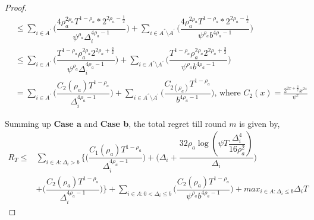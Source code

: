 \begin{proof}
\begin{align*}
&\leq\sum_{i\in A^{'}}\bigg(\dfrac{4\rho_{a}^{2\rho_{a}}T^{1-\rho_{a}}*2^{2\rho_{a}-\frac{1}{2}}}{\psi^{\rho_{a}}\Delta_{i}^{4\rho_{a}-1}} \bigg)+\sum_{i\in A^{''}\setminus A^{'}}\bigg(\dfrac{4\rho_{a}^{2\rho_{a}}T^{1-\rho_{a}}*2^{2\rho_{a}-\frac{1}{2}}}{\psi^{\rho_{a}}b^{4\rho_{a}-1}} \bigg)\\
&\leq\sum_{i\in A^{'}}\bigg(\dfrac{T^{1-\rho_{a}}\rho_{a}^{2\rho_{a}}2^{2\rho_{a}+\frac{3}{2}}}{\psi^{\rho_{a}}\Delta_{i}^{4\rho_{a}-1}} \bigg)+\sum_{i\in A^{''}\setminus A^{'}}\bigg(\dfrac{T^{1-\rho_{a}}\rho_{a}^{2\rho_{a}}2^{2\rho_{a}+\frac{3}{2}}}{\psi^{\rho_{a}}b^{4\rho_{a}-1}} \bigg)\\
& = \sum_{i\in A^{'}}\bigg(\dfrac{ C_{2}(\rho_{a}) T^{1-\rho_{a}}}{\Delta_{i}^{4\rho_{a}-1}} \bigg)+\sum_{i\in A^{''}\setminus A^{'}}\bigg(\dfrac{C_{2(\rho_{a})}T^{1-\rho_{a}}}{b^{4\rho_{a}-1}} \bigg) \text{, where } C_2(x) = \frac{2^{2x+\frac{3}{2}}x^{2x}}{\psi^{x}}
\end{align*}


 
Summing up \textbf{Case a} and \textbf{Case b}, the total regret till round $m$ is given by,
\begin{align*}
 R_{T} \leq &\sum\limits_{i\in A:\Delta_{i} > b}\bigg\lbrace\bigg(\dfrac{C_{1}(\rho_{a})T^{1-\rho_{a}}}{\Delta_{i}^{4\rho_{a}-1}}\bigg) + \bigg(\Delta_{i}+\dfrac{32\rho_{a}\log{(\psi  T\dfrac{\Delta_{i}^{4}}{16\rho_{a}^{2}})}}{\Delta_{i}}\bigg)\\
&  +  \bigg(\dfrac{C_{2}(\rho_{a})T^{1-\rho_{a}}}{\Delta_{i}^{4\rho_{a} -1}} \bigg) \bigg \rbrace+\sum\limits_{i\in A:0 < \Delta_{i}\leq b}\bigg(\dfrac{C_{2}(\rho_{a})T^{1-\rho_{a}}}{\psi^{\rho_{a}}b^{4\rho_{a} -1}} \bigg) + max_{i\in A:\Delta_{i}\leq b}\Delta_{i}T
\end{align*}

  
\end{proof}

